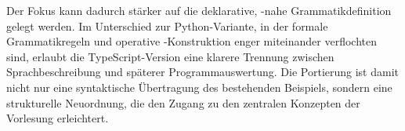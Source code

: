 Der Fokus kann dadurch stärker auf die deklarative, -nahe Grammatikdefinition gelegt werden. Im Unterschied zur Python-Variante, in der formale Grammatikregeln und operative -Konstruktion enger miteinander verflochten sind, erlaubt die TypeScript-Version eine klarere Trennung zwischen Sprachbeschreibung und späterer Programmauswertung. Die Portierung ist damit nicht nur eine syntaktische Übertragung des bestehenden Beispiels, sondern eine strukturelle Neuordnung, die den Zugang zu den zentralen Konzepten der Vorlesung erleichtert.